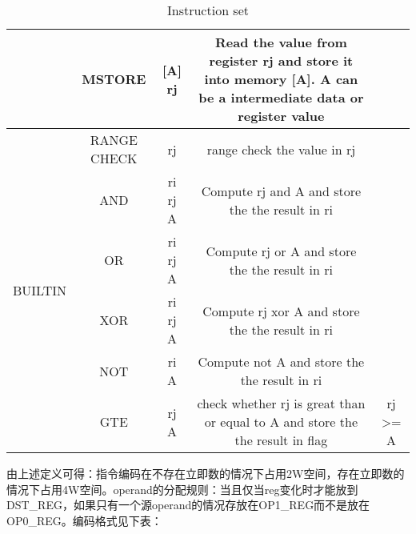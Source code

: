 \begin{table}[!ht]
{\begin{tabular}{|c|c|c|c|c|}
            & MSTORE & [A] rj & Read the value from register rj and store it into memory [A]. A can be a intermediate data or register value &  \\ \hline
            \multirow{8}{*}{BUILTIN} & RANGE CHECK & rj & range check the value in rj  &  \\ \cline{2-5}
            & AND & ri rj A &  Compute rj and A and store the the result in ri &  \\ \cline{2-5}
            & OR & ri rj A &  Compute rj or A and store the the result in ri &  \\ \cline{2-5}
            & XOR & ri rj A &  Compute rj xor A and store the the result in ri &  \\ \cline{2-5}
            & NOT & ri A &  Compute not A and store the the result in ri &  \\ \cline{2-5}
            & GTE & rj A &  check whether rj is great than or equal to A and store the the result in flag &  rj >= A \\ \hline
        \end{tabular}%
    }
    \caption{Instruction set}
    \label{table:instruction-set}
\end{table}

由上述定义可得：指令编码在不存在立即数的情况下占用2W空间，存在立即数的情况下占用4W空间。operand的分配规则：当且仅当reg变化时才能放到DST\_REG，如果只有一个源operand的情况存放在OP1\_REG而不是放在OP0\_REG。编码格式见下表：

\begin{table}[!ht]
    \centering {}
    \caption{OlaVM指令编码格式}
    \label{table: processor_instruction_decode}
\end{table}

